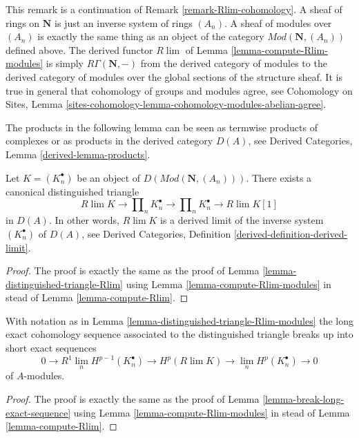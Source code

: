 \begin{remark}
\label{remark-Rlim-cohomology-modules}
This remark is a continuation of Remark \ref{remark-Rlim-cohomology}.
A sheaf of rings on $\mathbf{N}$ is just an inverse system of rings
$(A_n)$. A sheaf of modules over $(A_n)$ is exactly the same thing
as an object of the category $\textit{Mod}(\mathbf{N}, (A_n))$
defined above. The derived functor $R\lim$ of
Lemma \ref{lemma-compute-Rlim-modules}
is simply $R\Gamma(\mathbf{N}, -)$ from the derived category of
modules to the derived category of modules over the global sections
of the structure sheaf. It
is true in general that cohomology of groups and modules agree, see
Cohomology on Sites, Lemma
\ref{sites-cohomology-lemma-cohomology-modules-abelian-agree}.
\end{remark}

\noindent
The products in the following lemma can be seen as termwise products
of complexes or as products in the derived category $D(A)$, see
Derived Categories, Lemma \ref{derived-lemma-products}.

\begin{lemma}
\label{lemma-distinguished-triangle-Rlim-modules}
Let $K = (K_n^\bullet)$ be an object of
$D(\textit{Mod}(\mathbf{N}, (A_n)))$.
There exists a canonical distinguished triangle
$$
R\lim K \to \prod\nolimits_n K_n^\bullet \to \prod\nolimits_n K_n^\bullet
\to R\lim K[1]
$$
in $D(A)$. In other words, $R\lim K$ is a derived limit
of the inverse system $(K_n^\bullet)$ of $D(A)$, see
Derived Categories, Definition \ref{derived-definition-derived-limit}.
\end{lemma}

\begin{proof}
The proof is exactly the same as the proof of
Lemma \ref{lemma-distinguished-triangle-Rlim}
using Lemma \ref{lemma-compute-Rlim-modules} in stead of
Lemma \ref{lemma-compute-Rlim}.
\end{proof}

\begin{lemma}
\label{lemma-break-long-exact-sequence-modules}
With notation as in Lemma \ref{lemma-distinguished-triangle-Rlim-modules}
the long exact cohomology sequence associated to the distinguished
triangle breaks up into short exact sequences
$$
0 \to R^1\lim_n H^{p - 1}(K_n^\bullet) \to
H^p(R\lim K) \to
\lim_n H^p(K_n^\bullet) \to 0
$$
of $A$-modules.
\end{lemma}

\begin{proof}
The proof is exactly the same as the proof of
Lemma \ref{lemma-break-long-exact-sequence}
using Lemma \ref{lemma-compute-Rlim-modules} in stead of
Lemma \ref{lemma-compute-Rlim}.
\end{proof}

